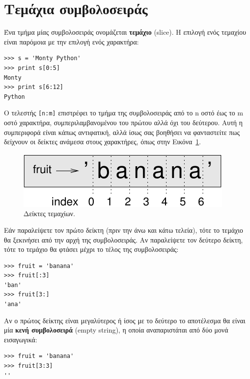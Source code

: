 \documentclass[10pt]{book}
\begin{document}
\section{Τεμάχια συμβολοσειράς}
\label{slice}

Ένα τμήμα μίας συμβολοσειράς ονομάζεται {\bf τεμάχιο} (slice). Η επιλογή ενός
τεμαχίου είναι παρόμοια με την επιλογή ενός χαρακτήρα:

\begin{verbatim}
>>> s = 'Monty Python'
>>> print s[0:5]
Monty
>>> print s[6:12]
Python
\end{verbatim}
%

Ο τελεστής {\tt [n:m]} επιστρέφει το τμήμα της συμβολοσειράς από το
n οστό έως το m οστό χαρακτήρα, συμπεριλαμβανομένου του πρώτου αλλά όχι του δεύτερου. Αυτή η συμπεριφορά είναι κάπως αντιφατική, αλλά ίσως σας βοηθήσει να φανταστείτε πως δείχνουν οι δείκτες ανάμεσα στους χαρακτήρες, όπως στην Εικόνα~\ref{fig.banana}.

\begin{figure}
\centerline
{\includegraphics[scale=0.8]{figs/banana.pdf}}
\caption{Δείκτες τεμαχίων.}
\label{fig.banana}
\end{figure}


Εάν παραλείψετε τον πρώτο δείκτη (πριν την άνω και κάτω τελεία), τότε το τεμάχιο θα ξεκινήσει από την αρχή της συμβολοσειράς. Αν παραλείψετε τον δεύτερο δείκτη, τότε το τεμάχιο θα φτάσει μέχρι το τέλος της συμβολοσειράς:

\begin{verbatim}
>>> fruit = 'banana'
>>> fruit[:3]
'ban'
>>> fruit[3:]
'ana'
\end{verbatim}
%

Αν ο πρώτος δείκτης είναι μεγαλύτερος ή ίσος με το δεύτερο το αποτέλεσμα θα είναι μία {\bf κενή συμβολοσειρά} (empty string), η οποία αναπαριστάται από δύο μονά εισαγωγικά:

\begin{verbatim}
>>> fruit = 'banana'
>>> fruit[3:3]
''
\end{verbatim}
%
\end{document}
